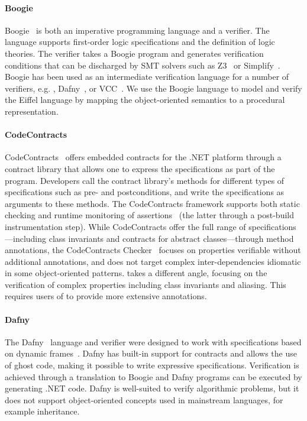 \paragraph{Boogie}

Boogie~\cite{LEINO08} is both an imperative programming language and a verifier.
The language supports first-order logic specifications and the definition of logic theories.
The verifier takes a Boogie program and generates verification conditions that can be discharged by SMT solvers such as Z3~\cite{MOURA08} or Simplify~\cite{DETLEFS05}.
Boogie has been used as an intermediate verification language for a number of verifiers, e.g. \AutoProof, Dafny~\cite{LEINO10}, or VCC~\cite{COHEN09}.
We use the Boogie language to model and verify the Eiffel language by mapping the object-oriented semantics to a procedural representation.

\paragraph{CodeContracts}

CodeContracts~\cite{BARNETT10} offers embedded contracts for the .NET platform through a contract library that allows one to express the specifications as part of the program.
Developers call the contract library's methods for different types of specifications such as pre- and postconditions, and write the specifications as arguments to these methods.
The CodeContracts framework supports both static checking and runtime monitoring of assertions~\cite{FAEHNDRICH10} (the latter through a post-build instrumentation step).
While CodeContracts offer the full range of specifications---including class invariants and contracts for abstract classes---through method annotations, the CodeContracts Checker~\cite{LOGOZZO12} focuses on properties verifiable without additional annotations, and does not target complex inter-dependencies idiomatic in some object-oriented patterns.
\AutoProof takes a different angle, focusing on the verification of complex properties including class invariants and aliasing.
This requires users of \AutoProof to provide more extensive annotations.

\paragraph{Dafny}

The Dafny~\cite{LEINO10} language and verifier were designed to work with specifications based on dynamic frames~\cite{KASSIOS06}.
Dafny has built-in support for contracts and allows the use of ghost code, making it possible to write expressive specifications.
Verification is achieved through a translation to Boogie and Dafny programs can be executed by generating .NET code.
Dafny is well-suited to verify algorithmic problems, but it does not support object-oriented concepts used in mainstream languages, for example inheritance.

